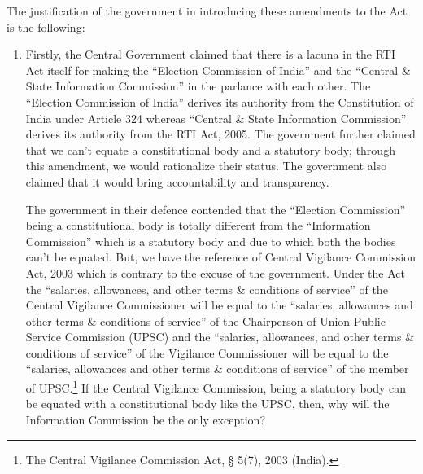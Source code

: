 \vspace{3pt}

\begin{multicols}{2}


\noi
The justification of the government in introducing these amendments to the Act is the
following:

\vspace{-.3cm}

\begin{enumerate}
\itemsep=0pt
\item Firstly, the Central Government claimed that there is a lacuna in the RTI Act itself for
making the “Election Commission of India” and the “Central \& State Information
Commission” in the parlance with each other. The “Election Commission of India”
derives its authority from the Constitution of India under Article 324 whereas
“Central \& State Information Commission” derives its authority from the RTI Act,
2005. The government further claimed that we can’t equate a constitutional body and
a statutory body; through this amendment, we would rationalize their status. The
government also claimed that it would bring accountability and transparency.

\noi
The government in their defence contended that the “Election Commission” being a
constitutional body is totally different from the “Information Commission” which is a
statutory body and due to which both the bodies can’t be equated. But, we have the
reference of Central Vigilance Commission Act, 2003 which is contrary to the excuse
of the government. Under the Act the “salaries, allowances, and other terms
\& conditions of service” of the Central Vigilance Commissioner will be equal to the
“salaries, allowances and other terms \& conditions of service” of the Chairperson of
Union Public Service Commission (UPSC) and the “salaries, allowances, and other
terms \& conditions of service” of the Vigilance Commissioner will be equal to the
“salaries, allowances and other terms \& conditions of service” of the member of
UPSC.\footnote{The Central Vigilance Commission Act, § 5(7), 2003 (India).} 
If the Central Vigilance Commission, being a statutory body can be equated
with a constitutional body like the UPSC, then, why will the Information Commission
be the only exception?
\end{enumerate}

\vspace{-.3cm}


\end{multicols}
